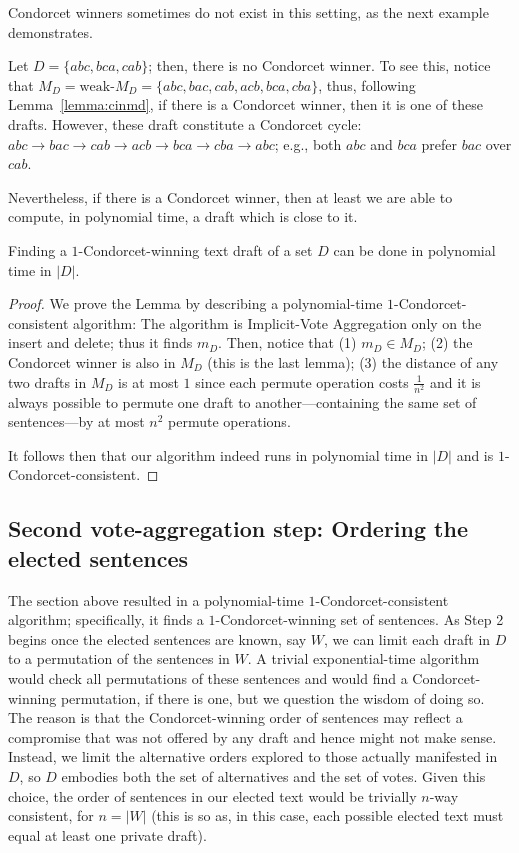 \documentclass{llncs}
\begin{document}
Condorcet winners sometimes do not exist in this setting, as the next example demonstrates.

\begin{example}
%
Let $D = \{abc, bca, cab\}$; then, there is no Condorcet winner. To see this, notice that $M_D = \textrm{weak-}M_D = \{abc, bac, cab, acb, bca, cba\}$, thus, following Lemma~\ref{lemma:cinmd}, if there is a Condorcet winner, then it is one of these drafts. However, these draft constitute a Condorcet cycle: $abc \to bac \to cab \to acb \to bca \to cba \to abc$; e.g., both $abc$ and $bca$ prefer $bac$ over $cab$.
%
\end{example}

Nevertheless, if there is a Condorcet winner, then at least we are able to compute, in polynomial time, a draft which is close to it.

\begin{lemma}
  Finding a $1$-Condorcet-winning text draft of a set $D$ can be done in polynomial time in $|D|$.
\end{lemma}

\begin{proof}
%
We prove the Lemma by describing a polynomial-time $1$-Condorcet-consistent algorithm:
  The algorithm is Implicit-Vote Aggregation only on the insert and delete; thus it finds $m_D$.
Then, notice that
(1) $m_D \in M_D$;
(2) the Condorcet winner is also in $M_D$ (this is the last lemma);
(3) the distance of any two drafts in $M_D$ is at most $1$  since each permute operation costs $\frac{1}{n^2}$ and it is always possible to permute one draft to another---containing the same set of sentences---by at most $n^2$ permute operations.

It follows then that our algorithm indeed runs in polynomial time in $|D|$ and is $1$-Condorcet-consistent.
%
\end{proof}

\subsection{Second vote-aggregation step: Ordering the elected sentences}

The section above resulted in a polynomial-time $1$-Condorcet-consistent algorithm; specifically, it finds a $1$-Condorcet-winning set of sentences.
As Step 2 begins once the elected sentences are known, say $W$, we can limit each draft in $D$ to a permutation of the sentences in $W$.
A trivial exponential-time algorithm would check all permutations of these sentences and would find a Condorcet-winning permutation, if there is one, but we question the wisdom of doing so. The reason is that the Condorcet-winning order of sentences may reflect a compromise that was not offered by any draft and hence might not make sense.
Instead, we limit the alternative orders explored to those actually manifested in $D$, so $D$ embodies both the set of alternatives and the set of votes. Given this choice, the order of sentences in our elected text would be trivially $n$-way consistent, for $n = |W|$
(this is so as, in this case, each possible elected text must equal at least one private draft).
\end{document}

